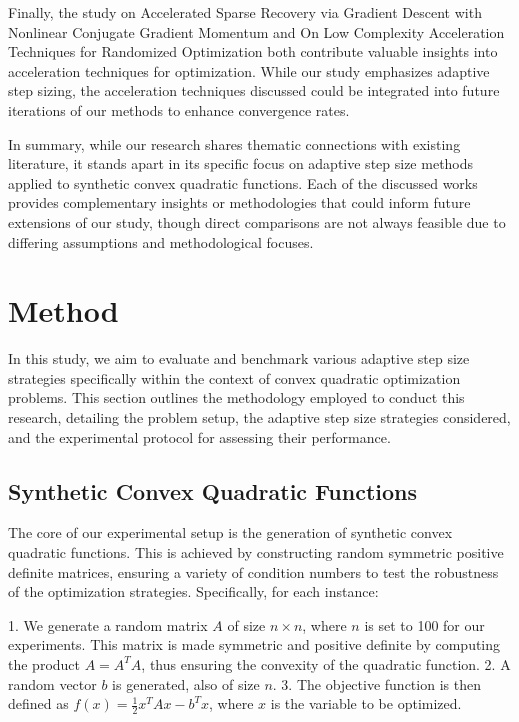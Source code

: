\documentclass[11pt]{article}
\begin{document}
Finally, the study on Accelerated Sparse Recovery via Gradient Descent with Nonlinear Conjugate Gradient Momentum \cite{Hu2022AcceleratedSR} and On Low Complexity Acceleration Techniques for Randomized Optimization \cite{Stich2014OnLC} both contribute valuable insights into acceleration techniques for optimization. While our study emphasizes adaptive step sizing, the acceleration techniques discussed could be integrated into future iterations of our methods to enhance convergence rates.

In summary, while our research shares thematic connections with existing literature, it stands apart in its specific focus on adaptive step size methods applied to synthetic convex quadratic functions. Each of the discussed works provides complementary insights or methodologies that could inform future extensions of our study, though direct comparisons are not always feasible due to differing assumptions and methodological focuses.

\section{Method}

In this study, we aim to evaluate and benchmark various adaptive step size strategies specifically within the context of convex quadratic optimization problems. This section outlines the methodology employed to conduct this research, detailing the problem setup, the adaptive step size strategies considered, and the experimental protocol for assessing their performance.

\subsection{Synthetic Convex Quadratic Functions}

The core of our experimental setup is the generation of synthetic convex quadratic functions. This is achieved by constructing random symmetric positive definite matrices, ensuring a variety of condition numbers to test the robustness of the optimization strategies. Specifically, for each instance:

1. We generate a random matrix \( A \) of size \( n \times n \), where \( n \) is set to 100 for our experiments. This matrix is made symmetric and positive definite by computing the product \( A = A^T A \), thus ensuring the convexity of the quadratic function.
2. A random vector \( b \) is generated, also of size \( n \).
3. The objective function is then defined as \( f(x) = \frac{1}{2} x^T A x - b^T x \), where \( x \) is the variable to be optimized.
\end{document}
